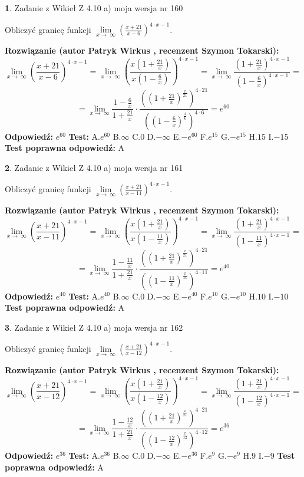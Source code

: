 \documentclass[12pt, a4paper]{article}
\theoremstyle{definition} %
\newtheorem{zad}{}
\newcommand{\zadStart}[1]{\begin{zad}#1\newline}
\newcommand{\zadStop}{\end{zad}}
\newcommand{\rozwStart}[2]{\noindent \textbf{Rozwiązanie (autor #1 , recenzent #2): }\newline}
\newcommand{\rozwStop}{\newline}
\newcommand{\odpStart}{\noindent \textbf{Odpowiedź:}\newline}
\newcommand{\odpStop}{\newline}
\newcommand{\testStart}{\noindent \textbf{Test:}\newline}
\newcommand{\testStop}{\newline}
\newcommand{\kluczStart}{\noindent \textbf{Test poprawna odpowiedź:}\newline}
\newcommand{\kluczStop}{\newline}
\begin{document}
\zadStart{Zadanie z Wikieł Z 4.10 a) moja wersja nr 160}

Obliczyć granicę funkcji  $\lim\limits_{x\to\ \infty}(\frac{x+21}{x-6})^{4\cdot x-1}$.
\zadStop
\rozwStart{Patryk Wirkus}{Szymon Tokarski}
$$\lim\limits_{x\to\ \infty}(\frac{x+21}{x-6})^{4\cdot x-1} = \lim\limits_{x\to\ \infty}(\frac{x(1+\frac{21}{x})}{x(1-\frac{6}{x})})^{4\cdot x-1}=\lim\limits_{x\to\ \infty}\frac{(1+\frac{21}{x})^{4\cdot x-1}}{(1-\frac{6}{x})^{4\cdot x-1}}=$$
$$=\lim\limits_{x\to\ \infty}\frac{1-\frac{6}{x}}{1+\frac{21}{x}}\cdot\frac{((1+\frac{21}{x})^{\frac{x}{21}})^{4\cdot21}}{((1-\frac{6}{x})^{\frac{x}{6}})^{4\cdot6}}=e^{60}$$
\rozwStop
\odpStart
$e^{60}$
\odpStop
\testStart
A.$e^{60}$ B.$\infty$ C.$0$ D.$-\infty$ E.$-e^{60}$
F.$e^{15}$ G.$-e^{15}$
H.$15$
I.$-15$
\testStop
\kluczStart
A
\kluczStop



\zadStart{Zadanie z Wikieł Z 4.10 a) moja wersja nr 161}

Obliczyć granicę funkcji  $\lim\limits_{x\to\ \infty}(\frac{x+21}{x-11})^{4\cdot x-1}$.
\zadStop
\rozwStart{Patryk Wirkus}{Szymon Tokarski}
$$\lim\limits_{x\to\ \infty}(\frac{x+21}{x-11})^{4\cdot x-1} = \lim\limits_{x\to\ \infty}(\frac{x(1+\frac{21}{x})}{x(1-\frac{11}{x})})^{4\cdot x-1}=\lim\limits_{x\to\ \infty}\frac{(1+\frac{21}{x})^{4\cdot x-1}}{(1-\frac{11}{x})^{4\cdot x-1}}=$$
$$=\lim\limits_{x\to\ \infty}\frac{1-\frac{11}{x}}{1+\frac{21}{x}}\cdot\frac{((1+\frac{21}{x})^{\frac{x}{21}})^{4\cdot21}}{((1-\frac{11}{x})^{\frac{x}{11}})^{4\cdot11}}=e^{40}$$
\rozwStop
\odpStart
$e^{40}$
\odpStop
\testStart
A.$e^{40}$ B.$\infty$ C.$0$ D.$-\infty$ E.$-e^{40}$
F.$e^{10}$ G.$-e^{10}$
H.$10$
I.$-10$
\testStop
\kluczStart
A
\kluczStop



\zadStart{Zadanie z Wikieł Z 4.10 a) moja wersja nr 162}

Obliczyć granicę funkcji  $\lim\limits_{x\to\ \infty}(\frac{x+21}{x-12})^{4\cdot x-1}$.
\zadStop
\rozwStart{Patryk Wirkus}{Szymon Tokarski}
$$\lim\limits_{x\to\ \infty}(\frac{x+21}{x-12})^{4\cdot x-1} = \lim\limits_{x\to\ \infty}(\frac{x(1+\frac{21}{x})}{x(1-\frac{12}{x})})^{4\cdot x-1}=\lim\limits_{x\to\ \infty}\frac{(1+\frac{21}{x})^{4\cdot x-1}}{(1-\frac{12}{x})^{4\cdot x-1}}=$$
$$=\lim\limits_{x\to\ \infty}\frac{1-\frac{12}{x}}{1+\frac{21}{x}}\cdot\frac{((1+\frac{21}{x})^{\frac{x}{21}})^{4\cdot21}}{((1-\frac{12}{x})^{\frac{x}{12}})^{4\cdot12}}=e^{36}$$
\rozwStop
\odpStart
$e^{36}$
\odpStop
\testStart
A.$e^{36}$ B.$\infty$ C.$0$ D.$-\infty$ E.$-e^{36}$
F.$e^{9}$ G.$-e^{9}$
H.$9$
I.$-9$
\testStop
\kluczStart
A
\kluczStop
\end{document}
